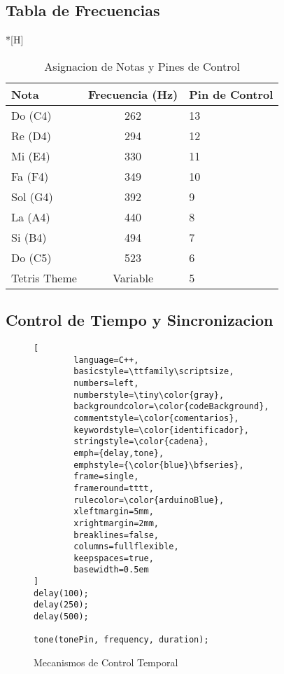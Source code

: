 \subsection{Tabla de Frecuencias}
\begin{table}*[H]
	\centering
	\begin{tabular}{|l|c|l|}
		\hline
		\textbf{Nota} & \textbf{Frecuencia (Hz)} & \textbf{Pin de Control} \\
		\hline
		Do (C4) & 262 & 13 \\
		Re (D4) & 294 & 12 \\
		Mi (E4) & 330 & 11 \\
		Fa (F4) & 349 & 10 \\
		Sol (G4) & 392 & 9 \\
		La (A4) & 440 & 8 \\
		Si (B4) & 494 & 7 \\
		Do (C5) & 523 & 6 \\
		Tetris Theme & Variable & 5 \\
		\hline
	\end{tabular}
	\caption{Asignacion de Notas y Pines de Control}
	\label{tab:frequency-pins}
\end{table}

\subsection{Control de Tiempo y Sincronizacion}
\begin{figure}[H]
	\centering
	\begin{lstlisting}[
		language=C++,
		basicstyle=\ttfamily\scriptsize,
		numbers=left,
		numberstyle=\tiny\color{gray},
		backgroundcolor=\color{codeBackground},
		commentstyle=\color{comentarios},
		keywordstyle=\color{identificador},
		stringstyle=\color{cadena},
		emph={delay,tone},
		emphstyle={\color{blue}\bfseries},
		frame=single,
		frameround=tttt,
		rulecolor=\color{arduinoBlue},
		xleftmargin=5mm,
		xrightmargin=2mm,
		breaklines=false,
		columns=fullflexible,
		keepspaces=true,
		basewidth=0.5em 
]
delay(100);    
delay(250);    
delay(500);    

tone(tonePin, frequency, duration);  
	\end{lstlisting}
	\caption{Mecanismos de Control Temporal}
	\label{fig:timing-control}
\end{figure}

